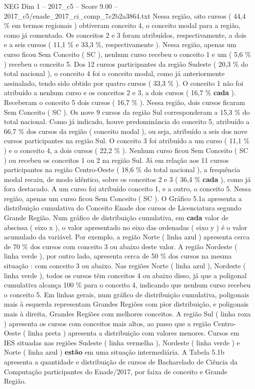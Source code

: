 \begin{textsample}{NEG Dim 1 – 2017\_c5 – Score 9.00 – 2017\_c5/enade\_2017\_ci\_comp\_7c2b2a3864.txt}
Nessa região, oito cursos ( 44,4 \% em termos regionais ) obtiveram conceito 4, o conceito modal para a região, como já comentado.
Os conceitos 2 e 3 foram atribuídos, respectivamente, a dois e a seis cursos ( 11,1 \% e 33,3 \%, respectivamente ).
Nessa região, apenas um curso ficou Sem Conceito ( SC ), nenhum curso recebeu o conceito 1 e um ( 5,6 \% ) recebeu o conceito 5.
Dos 12 cursos participantes da região Sudeste ( 20,3 \% do total nacional ), o conceito 4 foi o conceito modal, como já anteriormente assinalado, tendo sido obtido por quatro cursos ( 33,3 \% ).
O conceito 1 não foi atribuído a nenhum curso e os conceitos 2 e 3, a dois cursos ( 16,7 \% \textbf{cada} ).
Receberam o conceito 5 dois cursos ( 16,7 \% ).
Nessa região, dois cursos ficaram Sem Conceito ( SC ).
Os nove 9 cursos da região Sul corresponderam a 15,3 \% do total nacional.
Como já indicado, houve predominância do conceito 5, atribuído a 66,7 \% dos cursos da região ( conceito modal ), ou seja, atribuído a seis dos nove cursos participantes na região Sul.
O conceito 3 foi atribuído a um curso ( 11,1 \% ) e o conceito 4, a dois cursos ( 22,2 \% ).
Nenhum curso ficou Sem Conceito ( SC ) ou recebeu os conceitos 1 ou 2 na região Sul.
Já em relação aos 11 cursos participantes na região Centro-Oeste ( 18,6 \% do total nacional ), a frequência modal recaiu, de modo idêntico, sobre os conceitos 2 e 3 ( 36,4 \% \textbf{cada} ), como já fora destacado.
A um curso foi atribuído conceito 1, e a outro, o conceito 5.
Nessa região, apenas um curso ficou Sem Conceito ( SC ).
O Gráfico 5.1a apresenta a distribuição cumulativa do Conceito Enade dos cursos de Licenciatura segundo Grande Região.
Num gráfico de distribuição cumulativa, em \textbf{cada} valor de abscissa ( eixo x ), o valor apresentado no eixo das ordenadas ( eixo y ) é o valor acumulado da variável.
Por exemplo, a região Norte ( linha azul ) apresenta cerca de 70 \% dos cursos com conceito 3 ou abaixo deste valor.
A região Nordeste ( linha verde ), por outro lado, apresenta cerca de 50 \% dos cursos na mesma situação : com conceito 3 ou abaixo.
Nas regiões Norte ( linha azul ), Nordeste ( linha verde ), todos os cursos têm conceitos 4 ou abaixo disso, já que a poligonal cumulativa alcança 100 \% para o conceito 4, indicando que nenhum curso recebeu o conceito 5.
Em linhas gerais, num gráfico de distribuição cumulativa, poligonais mais à esquerda representam Grandes Regiões com pior distribuição, e poligonais mais à direita, Grandes Regiões com melhores conceitos.
A região Sul ( linha roxa ) apresenta os cursos com conceitos mais altos, ao passo que a região Centro-Oeste ( linha preta ) apresenta a distribuição com valores menores.
Cursos em IES situadas nas regiões Sudeste ( linha vermelha ), Nordeste ( linha verde ) e Norte ( linha azul ) \textbf{estão} em uma situação intermediária.
A Tabela 5.1b apresenta a quantidade e distribuição de cursos de Bacharelado de Ciência da Computação participantes do Enade/2017, por faixa de conceito e Grande Região.

\end{textsample}
